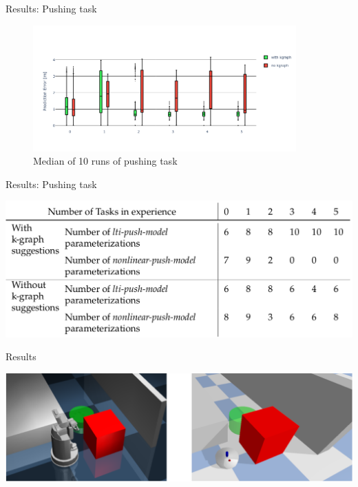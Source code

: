 \begin{frame}[fragile]{Results: Pushing task} 
  \vspace{-1cm}
\begin{center}
  \begin{figure}[H]
      \centering
   \includegraphics[width=0.9\textwidth]{figures/results/random_push_pe_vs}
  \caption{Median of 10 runs of pushing task}
  \end{figure}
\end{center}
\end{frame}

\begin{frame}[fragile]{Results: Pushing task} 
\begin{center}
\includegraphics[width=1.0\textwidth]{figures/results/random_push_para}
\end{center}
\end{frame}


\begin{frame}[fragile]{Results} 
\begin{center}
 \includegraphics[width=1.0\textwidth]{figures/results/compare_sota}
\end{center}
\end{frame}


